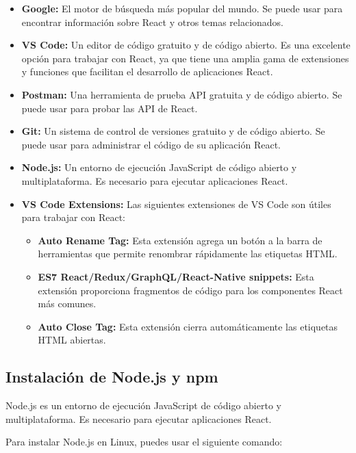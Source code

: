\documentclass[executivepaper]{article}
\begin{document}
\begin{itemize}
\item \textbf{Google:} El motor de búsqueda más popular del mundo. Se puede usar para encontrar información sobre React y otros temas relacionados.

\item \textbf{VS Code:} Un editor de código gratuito y de código abierto. Es una excelente opción para trabajar con React, ya que tiene una amplia gama de extensiones y funciones que facilitan el desarrollo de aplicaciones React.

\item \textbf{Postman:} Una herramienta de prueba API gratuita y de código abierto. Se puede usar para probar las API de React.

\item \textbf{Git:} Un sistema de control de versiones gratuito y de código abierto. Se puede usar para administrar el código de su aplicación React.

\item \textbf{Node.js:} Un entorno de ejecución JavaScript de código abierto y multiplataforma. Es necesario para ejecutar aplicaciones React.

\item \textbf{VS Code Extensions:} Las siguientes extensiones de VS Code son útiles para trabajar con React:
    \begin{itemize}
    \item \textbf{Auto Rename Tag:} Esta extensión agrega un botón a la barra de herramientas que permite renombrar rápidamente las etiquetas HTML.
    \item \textbf{ES7 React/Redux/GraphQL/React-Native snippets:} Esta extensión proporciona fragmentos de código para los componentes React más comunes.
    \item \textbf{Auto Close Tag:} Esta extensión cierra automáticamente las etiquetas HTML abiertas.
    \end{itemize}
\end{itemize}

\subsection{Instalación de Node.js y npm}

Node.js es un entorno de ejecución JavaScript de código abierto y multiplataforma. Es necesario para ejecutar aplicaciones React.

Para instalar Node.js en Linux, puedes usar el siguiente comando:
\end{document}
